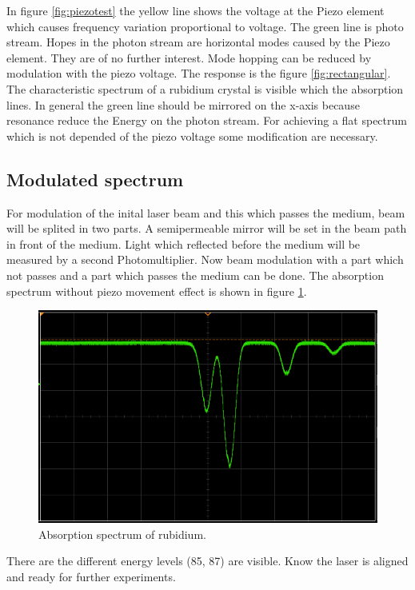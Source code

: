 In figure \ref{fig:piezotest} the yellow line shows the voltage at the Piezo
element which causes frequency variation proportional to voltage.
The green line is photo stream. 
Hopes in the photon stream are horizontal modes caused by the Piezo element.
They are of no further interest.
Mode hopping can be reduced by modulation with the piezo voltage. 
The response is the figure \ref{fig:rectangular}.
The characteristic spectrum of a rubidium crystal is visible which the
absorption lines. 
In general the green line should be mirrored on the x-axis because resonance
reduce the Energy on the photon stream. 
For achieving a flat spectrum which is not depended of the piezo voltage some
modification are necessary.

\subsection{Modulated spectrum}%
\label{sub:modulated_spectrum}

For modulation of the inital laser beam and this which passes the medium, beam
will be splited in two parts. 
A semipermeable mirror will be set in the beam path in front of the medium. 
Light which reflected before the medium will be measured by a second Photomultiplier.
Now beam modulation with a part which not passes and a part which passes the
medium can be done. 
The absorption spectrum without piezo movement effect is shown in figure
\ref{fig:modulation}.
\begin{figure}[h]
		\centering
		\includegraphics[width=0.8\linewidth]{./content/pictures/scope_140.png}
		\caption{Absorption spectrum of rubidium.}
		\label{fig:modulation}
\end{figure}
There are the different energy levels (85, 87) are
visible.
Know the laser is aligned and ready for further experiments.
